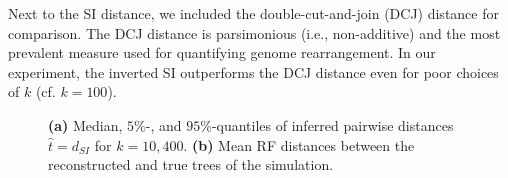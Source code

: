 \documentclass[9pt,english,utf8]{article}
\begin{document}
Next to the SI distance, we included the
double-cut-and-join (DCJ) distance for comparison. The DCJ distance is
parsimonious (i.e., non-additive) and the most prevalent measure used for
quantifying genome rearrangement. In our experiment, the inverted SI
outperforms the DCJ distance even for poor choices of $k$ (cf. $k=100$). 

\begin{figure}[tb]
    

    \caption{\textbf{(a)} Median, $5\%$-, and $95\%$-quantiles of inferred
    pairwise distances $\hat t = d_{SI}$ for $k=10, 400$. \textbf{(b)} Mean RF
distances between the reconstructed and true trees of the simulation. }
\label{fig:results}
\end{figure}


 
 
\end{document}
